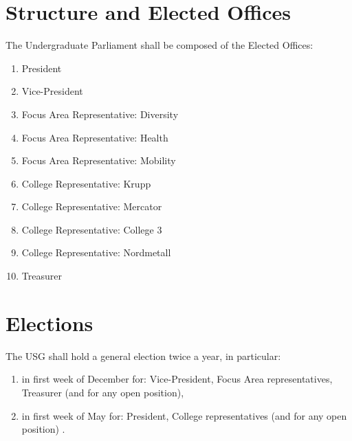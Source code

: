 \documentclass[12pt]{LaTeX_Misc/constitution}
\begin{document}
\section{Structure and Elected Offices} 
\label{ElectedOfficesDef}
The Undergraduate Parliament shall be composed of the Elected Offices:  
\begin{multicols}{2}
\begin{enumerate}
\item President
\item Vice-President
\item \label{FARepDef} Focus Area Representative: Diversity
\item Focus Area Representative: Health
\item Focus Area Representative: Mobility
\item \label{CRepDef}College Representative: Krupp 
\item College Representative: Mercator 
\item College Representative: College 3
\item College Representative: Nordmetall
\item \label{TreasurerDef} Treasurer
\end{enumerate}
\end{multicols}

\section{Elections}
\label{electiontimes}
The USG shall hold a general election twice a year, in particular:
\begin{enumerate}

\item in first week of December for: Vice-President, Focus Area representatives, Treasurer (and for any open position),
\item in first week of May for: President, College representatives (and for any open position) .
\end{enumerate}
\end{document}
